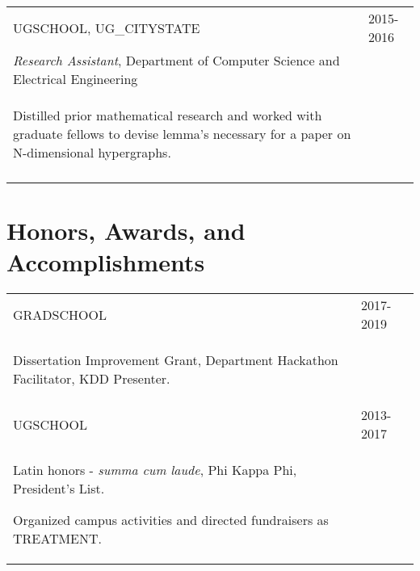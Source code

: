 \documentclass[a4paper,10pt]{article}
\begin{document}
\begin{supertabular}{p{13.9cm}>{\raggedleft\arraybackslash}p{3.4cm}}
	\textsc{UGSCHOOL}, UG_CITYSTATE
	& \textsc{2015-2016} \\
	\small	\emph{Research Assistant}, Department of Computer Science and Electrical Engineering & \\
	\begin{enumerate*}[label =$\circ$, itemjoin={\newline}]
		\item \footnotesize Distilled prior mathematical research and worked with graduate fellows to devise lemma's necessary for a paper on N-dimensional hypergraphs. 
	\end{enumerate*} & \\
	 \\


\end{supertabular}







\section{Honors, Awards, and Accomplishments}
\begin{supertabular}{p{13.9cm}>{\raggedleft\arraybackslash}p{3.4cm}}

	\textsc{GRADSCHOOL} 
	& \textsc{2017-2019} \\
	\begin{enumerate*}[label =$\circ$, itemjoin={\newline}]
		\item \footnotesize Dissertation Improvement Grant, Department Hackathon Facilitator, KDD Presenter.
	\end{enumerate*} \vspace{2mm} & \\

	\textsc{UGSCHOOL} 
	& \textsc{2013-2017} \\
	\begin{enumerate*}[label =$\circ$, itemjoin={\newline}]
		\item \footnotesize  Latin honors - \emph{summa cum laude}, Phi Kappa Phi, President's List.
		\item \footnotesize  Organized campus activities and directed fundraisers as TREATMENT.
	\end{enumerate*} \vspace{0mm} & \\



\end{supertabular}
\end{document}
